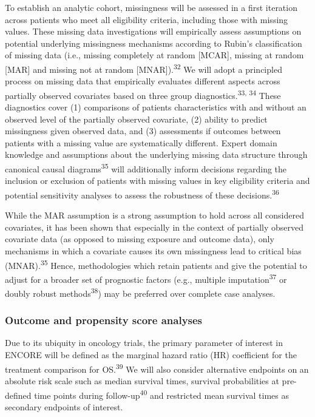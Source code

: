 \documentclass[
  letterpaper,
  DIV=11,
  numbers=noendperiod]{scrartcl}
\begin{document}
To establish an analytic cohort, missingness will be assessed in a first
iteration across patients who meet all eligibility criteria, including
those with missing values. These missing data investigations will
empirically assess assumptions on potential underlying missingness
mechanisms according to Rubin's classification of missing data (i.e.,
missing completely at random {[}MCAR{]}, missing at random {[}MAR{]} and
missing not at random {[}MNAR{]}).\textsuperscript{32} We will adopt a
principled process on missing data that empirically evaluates different
aspects across partially observed covariates based on three group
diagnostics.\textsuperscript{33, 34} These diagnostics cover (1)
comparisons of patients characteristics with and without an observed
level of the partially observed covariate, (2) ability to predict
missingness given observed data, and (3) assessments if outcomes between
patients with a missing value are systematically different. Expert
domain knowledge and assumptions about the underlying missing data
structure through canonical causal diagrams\textsuperscript{35} will
additionally inform decisions regarding the inclusion or exclusion of
patients with missing values in key eligibility criteria and potential
sensitivity analyses to assess the robustness of these
decisions.\textsuperscript{36}

While the MAR assumption is a strong assumption to hold across all
considered covariates, it has been shown that especially in the context
of partially observed covariate data (as opposed to missing exposure and
outcome data), only mechanisms in which a covariate causes its own
missingness lead to critical bias (MNAR).\textsuperscript{35} Hence,
methodologies which retain patients and give the potential to adjust for
a broader set of prognostic factors (e.g., multiple
imputation\textsuperscript{37} or doubly robust
methods\textsuperscript{38}) may be preferred over complete case
analyses.

\subsubsection{Outcome and propensity score
analyses}\label{outcome-and-propensity-score-analyses}

Due to its ubiquity in oncology trials, the primary parameter of
interest in ENCORE will be defined as the marginal hazard ratio (HR)
coefficient for the treatment comparison for OS.\textsuperscript{39} We
will also consider alternative endpoints on an absolute risk scale such
as median survival times, survival probabilities at pre-defined time
points during follow-up\textsuperscript{40} and restricted mean survival
times as secondary endpoints of interest.
\end{document}

